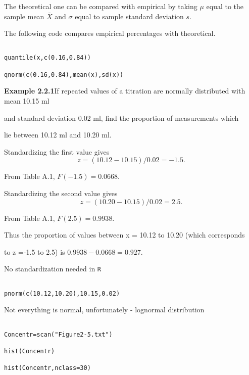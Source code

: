 The theoretical one can be compared with empirical by taking $\mu$ equal to the sample mean $\bar{X}$ and $\sigma$  equal to sample standard deviation $s$.

The following code compares empirical percentages with theoretical.

\begin{verbatim}

quantile(x,c(0.16,0.84))

qnorm(c(0.16,0.84),mean(x),sd(x))

\end{verbatim}

 



\textbf{Example 2.2.1}If repeated values of a titration are normally distributed with mean 10.15 ml

and standard deviation 0.02 ml, find the proportion of measurements which

lie between 10.12 ml and 10.20 ml.

 

Standardizing the first value gives \[z = (10.12 - 10.15)/0.02 = -1.5.\]

From Table A.1, $F(-1.5) = 0.0668$.

 

Standardizing the second value gives \[ z = (10.20 - 10.15)/0.02 = 2.5.\]

From Table A.1, $F(2.5) = 0.9938$.

 

Thus the proportion of values between x = 10.12 to 10.20 (which corresponds

to z =-1.5 to 2.5) is $0.9938 - 0.0668 = 0.927$.

 

No standardization needed in \texttt{R}

\begin{verbatim}

pnorm(c(10.12,10.20),10.15,0.02)

\end{verbatim}

 

Not everything is normal, unfortunately - lognormal distribution

\begin{verbatim}

Concentr=scan("Figure2-5.txt")

hist(Concentr)

hist(Concentr,nclass=30)

\end{verbatim}


